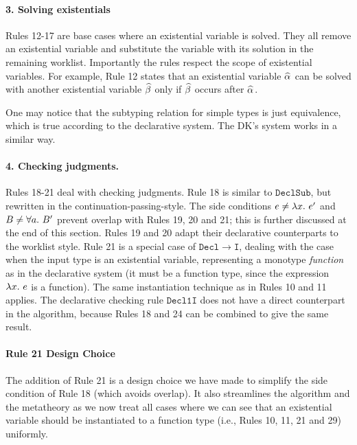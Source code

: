 \paragraph{\bf 3. Solving existentials} Rules 12-17 are base cases where an existential variable is solved.
They all remove an existential variable and substitute the
variable with its solution in the remaining worklist. Importantly the rules
respect the scope of existential variables. For example, Rule 12 
states that an existential variable $\al$ can be solved with another
existential variable $\bt$ only if $\bt$ occurs after $\al$.

One may notice that the subtyping relation for simple types is just equivalence,
which is true according to the declarative system.
The DK's system works in a similar way.

\paragraph{\bf 4. Checking judgments.}
Rules 18-21 deal with checking judgments.
Rule 18 is similar to $\mathtt{DeclSub}$, but rewritten in the
continuation-passing-style.
The side conditions $e \neq \lam e'$ and $B \neq \all B'$ 
prevent overlap with Rules 19, 20 and 21;
this is further discussed at the end of this section.
Rules 19 and 20 adapt their declarative counterparts to the worklist style.
Rule 21 is a special case of $\mathtt{Decl\to I}$,
dealing with the case when the input type is an existential variable,
representing a monotype \emph{function} as in the declarative system
(it must be a function type, since the expression $\lam e$ is a function).
The same instantiation technique as in Rules 10 and 11 applies.
The declarative checking rule $\mathtt{Decl1I}$ does not have a direct counterpart in the algorithm, 
because Rules 18 and 24 can be combined to give the same result.

\paragraph{Rule 21 Design Choice}
The addition of Rule 21 is a design choice we have made to simplify the side
condition of Rule 18 (which avoids overlap). It also streamlines the algorithm
and the metatheory as we now treat all cases
where we can see that an existential variable should be instantiated to a
function type  (i.e., Rules 10, 11, 21 and 29) uniformly.

